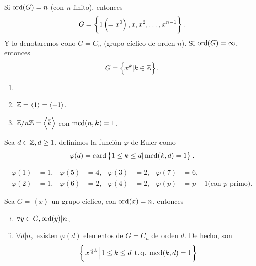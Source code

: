 \begin{obs}
    Si $\operatorname{ord}(G) = n$ (con $n$ finito), entonces
    \[
        G = \left\{ 1 \left( = x^0 \right), x, x^2, \dots, x^{n-1}\right\}.
    \]
    Y lo denotaremos cono $G = C_n$ (grupo cíclico de orden $n$).
    Si $\operatorname{ord}(G) = \infty$, entonces
    \[
        G = \left\{x^k \vert k \in \mathbb{Z}\right\}.
    \]
\end{obs}

\begin{example}
    \begin{enumerate}[1.]
        \item[]
        \item $\mathbb{Z} = \left< 1 \right> = \left< -1 \right>$.
        \item $\mathbb{Z}/n\mathbb{Z} = \left< \bar{k} \right>$ con $\operatorname{mcd}(n, k) = 1$.
    \end{enumerate}
\end{example}

\begin{defi}
    Sea $d \in \mathbb{Z}, d \geq 1$, definimos la función $\varphi$ de Euler como
    \[
        \varphi(d) = \operatorname{card} \left\{ 1 \leq k \leq d \vert \operatorname{mcd}(k, d) = 1\right\}.
    \]
\end{defi}

\begin{example}
    \begin{align*}
        \varphi(1) &= 1, & \varphi(5) &= 4, & \varphi(3) &= 2, & \varphi(7) &= 6, \\
        \varphi(2) &= 1, & \varphi(6) &= 2, & \varphi(4) &= 2, & \varphi(p) &= p-1 \text{(con } p \text{ primo).} 
    \end{align*}
\end{example}

\begin{prop}
    Sea $G = \left< x \right>$ un grupo cíclico, con $\operatorname{ord}(x) = n$, entonces
    \begin{enumerate}[i)]
        \item $\forall y \in G, \operatorname{ord}(y) \vert n$,
        \item $\forall d \vert n,$ existen $\varphi(d)$ elementos de $G = C_n$ de orden $d$. De hecho, son
            \[
                \left\{\left. x^{\frac{n}{d} k} \right\vert 1 \leq k \leq d \operatorname{\;t.q.\;} \operatorname{mcd}(k, d) = 1\right\}
            \]
    \end{enumerate}
\end{prop}

